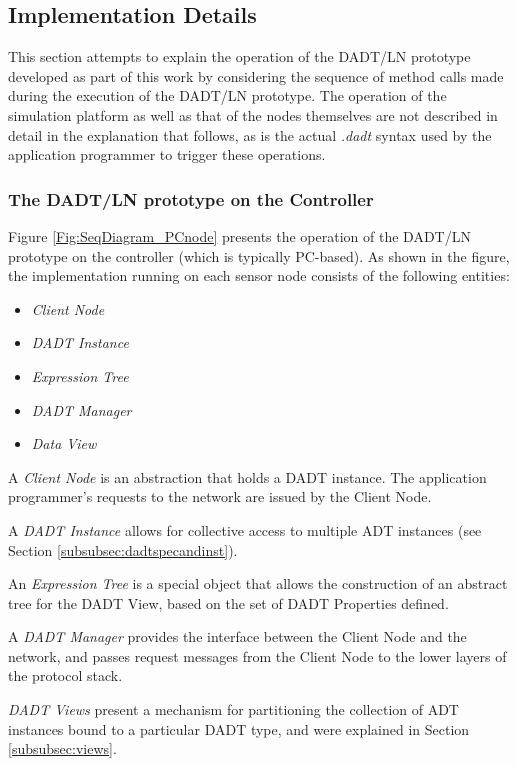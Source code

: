 \subsection{Implementation Details}

This section attempts to explain the operation of the DADT/LN prototype
developed as part of this work by considering the sequence of method calls made
during the execution of the DADT/LN prototype. The operation of the simulation platform as well as that of the
nodes themselves are not described in detail in the explanation that follows, as is the actual
\emph{.dadt} syntax used by the application programmer to trigger these
operations. 

\subsubsection{The DADT/LN prototype on the Controller}

Figure \ref{Fig:SeqDiagram_PCnode} presents the operation of the DADT/LN
prototype on the controller (which is typically PC-based). As shown in the figure, the implementation running on each sensor node 
consists of the following entities:

\begin{itemize}
  \item \emph{Client Node}
  \item \emph{DADT Instance}
  \item \emph{Expression Tree} 
  \item \emph{DADT Manager} 
  \item \emph{Data View} 
\end{itemize}

A \emph{Client Node} is an abstraction that holds a DADT
instance. The application programmer's requests to the network are issued
by the Client Node.
  
A \emph{DADT Instance} allows for collective access to multiple ADT instances (see Section \ref{subsubsec:dadtspecandinst}).

An \emph{Expression Tree} is a special object that allows the construction of an abstract
tree for the DADT View, based on the set of DADT Properties defined.

A \emph{DADT Manager} provides the interface between the Client Node and the
network, and passes request messages from the Client Node to the lower layers
of the protocol stack.

\emph{DADT Views} present a mechanism for partitioning the collection of
ADT instances bound to a particular DADT type, and were explained in Section
\ref{subsubsec:views}.

